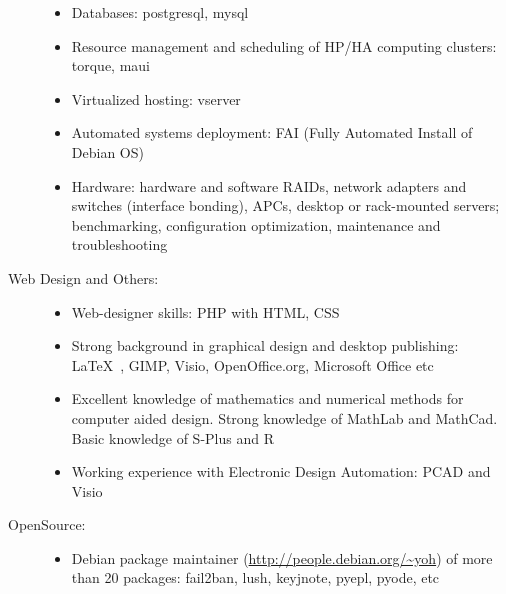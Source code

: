 \documentclass[12pt,overlapped,line]{res}
\newcommand{\wdescription}[1]{({\small \textit{#1}})}
\begin{document}
\begin{resume}
\begin{description}
\begin{itemize}
      \item Databases: postgresql, mysql

      \item Resource management and scheduling of HP/HA computing
        clusters: torque, maui

      \item Virtualized hosting: vserver

      \item Automated systems deployment: FAI (Fully Automated Install
        of Debian OS)

      \item Hardware: hardware and software RAIDs, network adapters
        and switches (interface bonding), APCs, desktop or
        rack-mounted servers; benchmarking, configuration
        optimization, maintenance and troubleshooting

      \end{itemize}

    \item[Web Design and Others:]  \hspace*{\fill}
      \begin{itemize}
      \item Web-designer skills: PHP with HTML, CSS%
      \item Strong background in graphical design and desktop
        publishing: \LaTeX\ , GIMP, Visio, OpenOffice.org, Microsoft Office etc

      \item Excellent knowledge of mathematics and numerical methods
        for computer aided design. Strong knowledge of MathLab and
        MathCad. Basic knowledge of S-Plus and R

      \item Working experience with Electronic Design Automation: PCAD and
        Visio
      \end{itemize}

   \item[{O}pen{S}ource:]\hspace*{\fill}
      \begin{itemize}
      \item Debian package maintainer
        (\url{http://people.debian.org/~yoh}) of more than 20 packages: fail2ban,
        lush, keyjnote, pyepl, pyode, etc


\end{itemize}
\end{description}
\end{resume}
\end{document}
